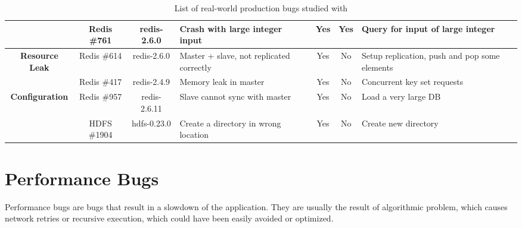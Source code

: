 \begin{table*}[ht]
{\begin{tabular}{@{}c c c p{5.15cm} c c p{4.5cm}@{}}
			& Redis \#761 & redis-2.6.0 & Crash with large integer input & Yes & Yes & Query for input of large integer \\ \midrule
			\multirow{2}{*}{\textbf{Resource Leak}} & Redis \#614 & redis-2.6.0 & Master + slave, not replicated correctly & Yes & No & Setup replication, push  and pop some elements \\ %
			& Redis \#417 & redis-2.4.9 & Memory leak in master & Yes & No & Concurrent key set requests \\ \midrule
			\multirow{2}{*}{\textbf{Configuration}} & Redis \#957 & redis-2.6.11 & Slave cannot sync with master & Yes & No & Load a very large DB \\ %
			& HDFS \#1904 & hdfs-0.23.0 & Create a directory in wrong location & Yes & No & Create new directory \\ \bottomrule
		\end{tabular}%
	}
	\caption{List of real-world production bugs studied with \parikshan}
	\label{tab:appendix-casestudy}
\end{table*}


\section{Performance Bugs}

Performance bugs are bugs that result in a slowdown of the application. They are usually the result of algorithmic problem, which causes network retries or recursive execution, which could have been easily avoided or optimized.

